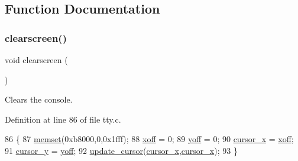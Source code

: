 \subsection{Function Documentation}
\mbox{\label{a00176_aff4bc17c602603d120756f52e18ebb96_aff4bc17c602603d120756f52e18ebb96}} 
\subsubsection{\texorpdfstring{clearscreen()}{clearscreen()}}
{\footnotesize\ttfamily void clearscreen (\begin{DoxyParamCaption}{ }\end{DoxyParamCaption})}



Clears the console. 



Definition at line 86 of file tty.\+c.


\begin{DoxyCode}
86                    \{
87     \hyperlink{a00131_a9e432f267691eceb2e2e0efcc37efbc9_a9e432f267691eceb2e2e0efcc37efbc9}{memset}(0xb8000,0,0x1fff);
88     \hyperlink{a00173_abaa0d20f0e52ce0d3a7d706f6ac16266_abaa0d20f0e52ce0d3a7d706f6ac16266}{xoff} = 0;
89     \hyperlink{a00173_a1a7539764d0ae8cd06ce45c62cf92bca_a1a7539764d0ae8cd06ce45c62cf92bca}{yoff} = 0;
90     \hyperlink{a00173_ae69604af0f9bd5fca2a016d0aa1ba7e1_ae69604af0f9bd5fca2a016d0aa1ba7e1}{cursor\_x} = \hyperlink{a00173_abaa0d20f0e52ce0d3a7d706f6ac16266_abaa0d20f0e52ce0d3a7d706f6ac16266}{xoff};
91     \hyperlink{a00173_a0301c5492919c401c2c1ecf52af709b0_a0301c5492919c401c2c1ecf52af709b0}{cursor\_y} = \hyperlink{a00173_a1a7539764d0ae8cd06ce45c62cf92bca_a1a7539764d0ae8cd06ce45c62cf92bca}{yoff};
92     \hyperlink{a00173_a492f5021d7340613e732ef37bbaa04e4_a492f5021d7340613e732ef37bbaa04e4}{update\_cursor}(\hyperlink{a00173_ae69604af0f9bd5fca2a016d0aa1ba7e1_ae69604af0f9bd5fca2a016d0aa1ba7e1}{cursor\_x},\hyperlink{a00173_ae69604af0f9bd5fca2a016d0aa1ba7e1_ae69604af0f9bd5fca2a016d0aa1ba7e1}{cursor\_x});
93 \}
\end{DoxyCode}
\mbox{\label{a00176_a3d09038c7b6436e60b228f2f3f451f6a_a3d09038c7b6436e60b228f2f3f451f6a}} 
